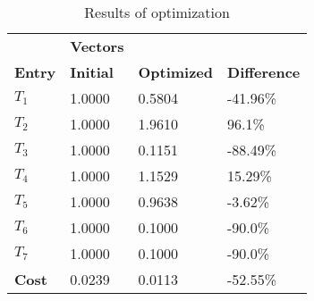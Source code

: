 \begin{table}[H]
\centering
\begin{tabular}{llll}
\textbf{}      & \cellcolor[HTML]{EFEFEF}\textbf{Vectors} & \textbf{} & \textbf{}         \\
\rowcolor[HTML]{EFEFEF} 
\textbf{Entry} & \textbf{Initial} & \textbf{Optimized} & \textbf{Difference} \\
$T_1$ & 1.0000 & 0.5804 & -41.96\% \\ 
$T_2$ & 1.0000 & 1.9610 & 96.1\% \\ 
$T_3$ & 1.0000 & 0.1151 & -88.49\% \\ 
$T_4$ & 1.0000 & 1.1529 & 15.29\% \\ 
$T_5$ & 1.0000 & 0.9638 & -3.62\% \\ 
$T_6$ & 1.0000 & 0.1000 & -90.0\% \\ 
$T_7$ & 1.0000 & 0.1000 & -90.0\% \\ 
\rowcolor[HTML]{EFEFEF} 
\textbf{Cost}  & 0.0239 & 0.0113 & -52.55\% \\ 
\end{tabular}
\caption{Results of optimization}
\label{tab:OptimizationAnalysis}
\end{table}
